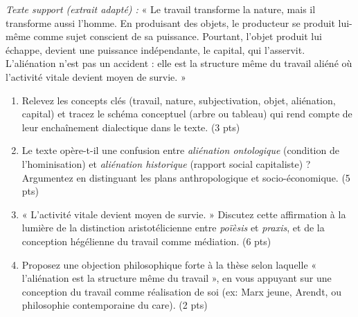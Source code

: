\documentclass[11pt]{article}
\begin{document}
\begin{exercice}
\textit{Texte support (extrait adapté) :} « Le travail transforme la nature, mais il transforme aussi l'homme. En produisant des objets, le producteur se produit lui-même comme sujet conscient de sa puissance. Pourtant, l'objet produit lui échappe, devient une puissance indépendante, le capital, qui l'asservit. L'aliénation n'est pas un accident : elle est la structure même du travail aliéné où l'activité vitale devient moyen de survie. » \\
\begin{enumerate}
    \item Relevez les concepts clés (travail, nature, subjectivation, objet, aliénation, capital) et tracez le schéma conceptuel (arbre ou tableau) qui rend compte de leur enchaînement dialectique dans le texte. (3 pts)
    \item Le texte opère-t-il une confusion entre \textit{aliénation ontologique} (condition de l'hominisation) et \textit{aliénation historique} (rapport social capitaliste) ? Argumentez en distinguant les plans anthropologique et socio-économique. (5 pts)
    \item « L'activité vitale devient moyen de survie. » Discutez cette affirmation à la lumière de la distinction aristotélicienne entre \textit{poïèsis} et \textit{praxis}, et de la conception hégélienne du travail comme médiation. (6 pts)
    \item Proposez une objection philosophique forte à la thèse selon laquelle « l'aliénation est la structure même du travail », en vous appuyant sur une conception du travail comme réalisation de soi (ex: Marx jeune, Arendt, ou philosophie contemporaine du care). (2 pts)
\end{enumerate}
\end{exercice}
\end{document}
